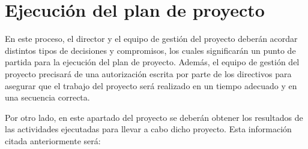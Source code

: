 \documentclass[11pt,a4paper,spanish,twoside]{report}
\begin{document}
\section{Ejecución del plan de proyecto}
En este proceso, el director y el equipo de gestión del proyecto deberán 
acordar distintos tipos de decisiones y compromisos, los cuales significarán 
un punto de partida para la ejecución del plan de proyecto. Además, el equipo 
de gestión del proyecto precisará de una autorización escrita por parte de los 
directivos para asegurar que el trabajo del proyecto será realizado en un 
tiempo adecuado y en una secuencia correcta.

Por otro lado, en este apartado del proyecto se deberán obtener los resultados 
de las actividades ejecutadas para llevar a cabo dicho proyecto. Esta 
información citada anteriormente será: 
\end{document}
